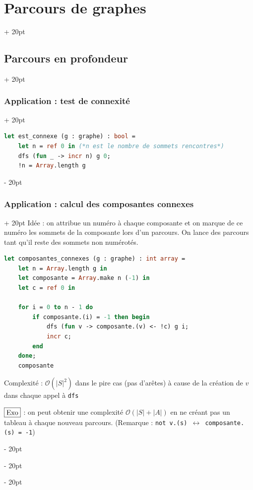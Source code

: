 \documentclass[a4paper, 12pt, twoside]{article}
\newcommand{\abs}[1]{\left\lvert #1 \right\rvert}
\newcommand{\ind}[1][20pt]{\advance\leftskip + #1}
\newcommand{\deind}[1][20pt]{\advance\leftskip - #1}
\newenvironment{indt}[2][20pt]{#2 \par \ind[#1]}{\par \deind} %
\begin{document}
\begin{indt}{\section{Parcours de graphes}}
\begin{indt}{\subsection{Parcours en profondeur}}
            \vspace{12pt}
            
            \begin{indt}{\subsubsection{Application : test de connexité}}
                \begin{lstlisting}[language=Caml, xleftmargin=80pt]
let est_connexe (g : graphe) : bool =
    let n = ref 0 in (*n est le nombre de sommets rencontres*)
    dfs (fun _ -> incr n) g 0;
    !n = Array.length g\end{lstlisting}
            \end{indt}

            \vspace{12pt}
            
            \begin{indt}{\subsubsection{Application : calcul des composantes connexes}}
                Idée : on attribue un numéro à chaque composante et on marque de ce numéro les sommets de la composante lors d'un parcours. On lance des parcours tant qu'il reste des sommets non numérotés.

                \begin{lstlisting}[language=Caml, xleftmargin=80pt]
let composantes_connexes (g : graphe) : int array =
    let n = Array.length g in
    let composante = Array.make n (-1) in
    let c = ref 0 in

    for i = 0 to n - 1 do
        if composante.(i) = -1 then begin
            dfs (fun v -> composante.(v) <- !c) g i;
            incr c;
        end
    done;
    composante
                \end{lstlisting}

                Complexité : $\mathcal O(\abs S ^2)$ dans le pire cas (pas d'arêtes) à cause de la création de $v$ dans chaque appel à \texttt{dfs}

                $\boxed{\rm Exo}$ : on peut obtenir une complexité $\mathcal O(\abs S + \abs A)$ en ne créant pas un tableau à chaque nouveau parcours. (Remarque : \texttt{not v.(s) $\leftrightarrow$ composante.(s) = -1})
            \end{indt}
        \end{indt}


\end{indt}
\end{document}
